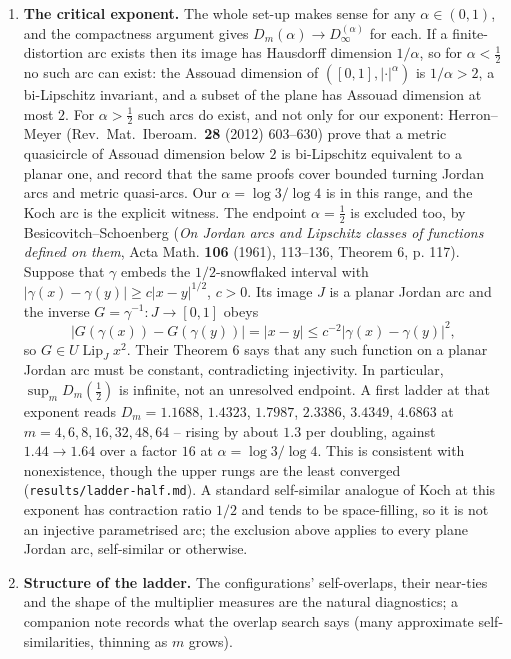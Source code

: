 \documentclass[11pt]{article}
\theoremstyle{remark}
\newcommand{\alp}{\alpha}
\begin{document}
\begin{enumerate}[label=(\alph*)]
\item \textbf{The critical exponent.} The whole set-up makes sense for any $\alp\in(0,1)$, and the
  compactness argument gives $D_m(\alp)\to D^{(\alp)}_\infty$ for each. If a finite-distortion arc
  exists then its image has Hausdorff dimension $1/\alp$, so for $\alp<\tfrac12$ no such arc can
  exist: the Assouad dimension of $([0,1],|\cdot|^{\alp})$ is $1/\alp>2$, a bi-Lipschitz invariant,
  and a subset of the plane has Assouad dimension at most $2$. For $\alp>\tfrac12$ such arcs do
  exist, and not only for our exponent: Herron--Meyer (Rev.\ Mat.\ Iberoam.\ \textbf{28} (2012)
  603--630) prove that a metric quasicircle of Assouad dimension below $2$ is bi-Lipschitz
  equivalent to a planar one, and record that the same proofs cover bounded turning Jordan arcs
  and metric quasi-arcs. Our $\alp=\log3/\log4$ is in this range, and the Koch arc is the explicit
  witness. The endpoint $\alp=\tfrac12$ is excluded too, by Besicovitch--Schoenberg
  (\emph{On Jordan arcs and Lipschitz classes of functions defined on them}, Acta Math. \textbf{106}
  (1961), 113--136, Theorem 6, p. 117). Suppose that $\gamma$ embeds the $1/2$-snowflaked interval
  with $|\gamma(x)-\gamma(y)|\ge c|x-y|^{1/2}$, $c>0$. Its image $J$ is a planar Jordan arc and the
  inverse $G=\gamma^{-1}\colon J\to[0,1]$ obeys
  \[
    |G(\gamma(x))-G(\gamma(y))|=|x-y|\le c^{-2}|\gamma(x)-\gamma(y)|^2,
  \]
  so $G\in U\operatorname{Lip}_J x^2$. Their Theorem 6 says that any such function on a planar Jordan
  arc must be constant, contradicting injectivity. In particular, $\sup_mD_m(\tfrac12)$ is infinite,
  not an unresolved endpoint. A first ladder at that exponent reads $D_m=1.1688$, $1.4323$, $1.7987$, $2.3386$,
  $3.4349$, $4.6863$ at $m=4,6,8,16,32,48,64$ -- rising by about $1.3$ per doubling, against
  $1.44\to1.64$ over a factor $16$ at $\alp=\log3/\log4$. This is consistent with nonexistence,
  though the upper rungs are the least converged
  (\texttt{results/ladder-half.md}). A standard self-similar analogue of Koch at this exponent has
  contraction ratio $1/2$ and tends to be space-filling, so it is not an injective parametrised arc;
  the exclusion above applies to every plane Jordan arc, self-similar or otherwise.

\item \textbf{Structure of the ladder.} The configurations' self-overlaps, their near-ties and the
  shape of the multiplier measures are the natural diagnostics; a companion note records what the
  overlap search says (many approximate self-similarities, thinning as $m$ grows).
\end{enumerate}
\end{document}
